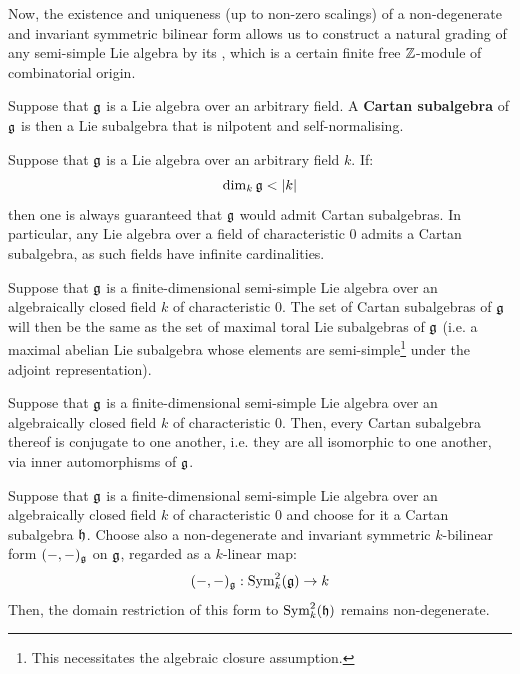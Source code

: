             Now, the existence and uniqueness (up to non-zero scalings) of a non-degenerate and invariant symmetric bilinear form allows us to construct a natural grading of any semi-simple Lie algebra by its , which is a certain finite free $\mathbb{Z}$-module of combinatorial origin. 
            \begin{definition} \label{def: cartan_subalgebras}
                Suppose that $\mathfrak{g}$ is a Lie algebra over an arbitrary field. A \textbf{Cartan subalgebra} of $\mathfrak{g}$ is then a Lie subalgebra that is nilpotent and self-normalising.  
            \end{definition}
            \begin{remark}
                Suppose that $\mathfrak{g}$ is a Lie algebra over an arbitrary field $k$. If:
                    $$\dim_k \mathfrak{g} < |k|$$
                then one is always guaranteed that $\mathfrak{g}$ would admit Cartan subalgebras. In particular, any Lie algebra over a field of characteristic $0$ admits a Cartan subalgebra, as such fields have infinite cardinalities. 
            \end{remark}
            \begin{lemma} \label{lemma: cartan_subalgebras_are_maxaimal_toral_subalgebras}
                Suppose that $\mathfrak{g}$ is a finite-dimensional semi-simple Lie algebra over an algebraically closed field $k$ of characteristic $0$. The set of Cartan subalgebras of $\mathfrak{g}$ will then be the same as the set of maximal toral Lie subalgebras of $\mathfrak{g}$ (i.e. a maximal abelian Lie subalgebra whose elements are semi-simple\footnote{This necessitates the algebraic closure assumption.} under the adjoint representation).  
            \end{lemma}
            \begin{lemma}
                Suppose that $\mathfrak{g}$ is a finite-dimensional semi-simple Lie algebra over an algebraically closed field $k$ of characteristic $0$. Then, every Cartan subalgebra thereof is conjugate to one another, i.e. they are all isomorphic to one another, via inner automorphisms of $\mathfrak{g}$. 
            \end{lemma}
            \begin{lemma} \label{lemma: non_degeneracy_of_invariant_bilinear_forms_on_cartan_subalgebras}
                Suppose that $\mathfrak{g}$ is a finite-dimensional semi-simple Lie algebra over an algebraically closed field $k$ of characteristic $0$ and choose for it a Cartan subalgebra $\mathfrak{h}$. Choose also a non-degenerate and invariant symmetric $k$-bilinear form $(-, -)_{\mathfrak{g}}$ on $\mathfrak{g}$, regarded as a $k$-linear map:
                    $$(-, -)_{\mathfrak{g}}: \mathrm{Sym}_k^2(\mathfrak{g}) \to k$$
                Then, the domain restriction of this form to $\mathrm{Sym}_k^2(\mathfrak{h})$ remains non-degenerate. 
            \end{lemma}
